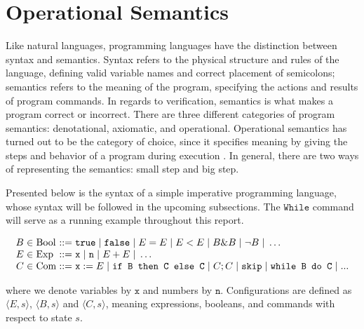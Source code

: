 \documentclass[a4paper,11pt,twoside]{report}
\begin{document}
\section{Operational Semantics}\label{sec:opsem}
Like natural languages, programming languages have the distinction between syntax and semantics. Syntax refers to the physical structure and rules of the language, defining valid variable names and correct placement of semicolons; semantics refers to the meaning of the program, specifying the actions and results of program commands. In regards to verification, semantics is what makes a program correct or incorrect. There are three different categories of program semantics: denotational, axiomatic, and operational. Operational semantics has turned out to be the category of choice, since it specifies meaning by giving the steps and behavior of a program during execution \cite{PittsAM:opespe}. In general, there are two ways of representing the semantics: small step and big step. 

Presented below is the syntax of a simple imperative programming language, whose syntax will be followed in the upcoming subsections. The $\mathtt{While}$ command will serve as a running example throughout this report.

$$
\arraycolsep=1.5pt
\begin{array}{rclcl}
B & \in & \mathrm{Bool} & ::= & \texttt{true} \myor \texttt{false} \myor E = E \myor E < E \myor B \& B \myor\neg B \myor \ldots \\
E & \in & \mathrm{Exp} & ::= & \texttt{x} \myor \texttt{n} \myor E + E \myor \ldots \\
C & \in & \mathrm{Com} & ::= & \texttt{x}:=E \myor \texttt{if B then C else C} \myor C; C \myor \texttt{skip} \myor \texttt{while B do C} \myor ...
\end{array}
$$

\noindent where we denote variables by $\texttt{x}$ and numbers by $\texttt{n}$. 
Configurations are defined as $\langle E,s \rangle$, $\langle B,s\rangle$ and $\langle C,s \rangle$, meaning expressions, booleans, and commands with respect to state $s$.
\end{document}
